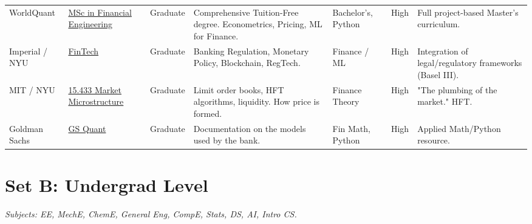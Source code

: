 \documentclass[10pt, a4paper, landscape]{article}
\begin{document}
\begin{longtable}{L{2cm} L{3.5cm} L{1.8cm} L{6cm} L{3.5cm} L{2cm} L{5cm}}
    \addlinespace
    WorldQuant & \href{https://www.wqu.edu/}{MSc in Financial Engineering} & Graduate & Comprehensive Tuition-Free degree. Econometrics, Pricing, ML for Finance. & Bachelor's, Python & High & Full project-based Master's curriculum. \\
    \addlinespace
    Imperial / NYU & \href{https://engineering.nyu.edu/academics/programs/fintech-ms}{FinTech} & Graduate & Banking Regulation, Monetary Policy, Blockchain, RegTech. & Finance / ML & High & Integration of legal/regulatory frameworks (Basel III). \\
    \addlinespace
    MIT / NYU & \href{https://ocw.mit.edu/courses/15-433-financial-markets-fall-2008/}{15.433 Market Microstructure} & Graduate & Limit order books, HFT algorithms, liquidity. How price is formed. & Finance Theory & High & "The plumbing of the market." HFT. \\
    \addlinespace
    Goldman Sachs & \href{https://developer.gs.com/docs/quant/}{GS Quant} & Graduate & Documentation on the models used by the bank. & Fin Math, Python & High & Applied Math/Python resource. \\

\end{longtable}

\newpage

\section*{Set B: Undergrad Level}
\textit{Subjects: EE, MechE, ChemE, General Eng, CompE, Stats, DS, AI, Intro CS.}
\end{document}
